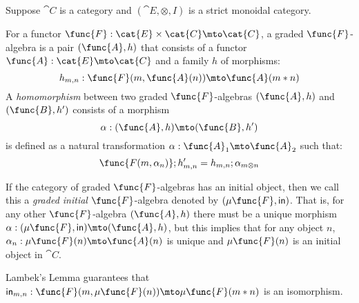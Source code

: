 Suppose $\cat{C}$ is a category and $(\cat{E},\otimes,I)$ is a strict
monoidal category.

\begin{definition}
    For a functor $\func{F} : \cat{E} \times \cat{C} \mto \cat{C}$, a
    graded $\func{F}$-algebra is a pair $(\func{A},h)$ that consists
    of a functor $\func{A} : \cat{E} \mto \cat{C}$ and a family $h$ of
    morphisms:
    \[ 
        h_{m,n} : \func{F}(m,\func{A}(n)) \mto \func{A}(m * n)
    \]
    A \emph{homomorphism} between two graded $\func{F}$-algebras
    $(\func{A},h)$ and $(\func{B},h')$ consists of a morphism
    \[
        \alpha : (\func{A},h) \mto (\func{B},h')
    \]
    is defined as a natural transformation $\alpha : \func{A}_1 \mto
    \func{A}_2$ such that:
    \[
        \func{F(m,\alpha_n)} ; h'_{m,n} = h_{m,n} ; \alpha_{m \otimes n}
    \]
\end{definition}

\begin{definition}
    If the category of graded $\func{F}$-algebras has an initial object, then
    we call this a \emph{graded initial} $\func{F}$-algebra denoted
    by $(\mu\func{F}, \mathsf{in})$.  That is, for any other
    $\func{F}$-algebra $(\func{A},h)$ there must be a unique morphism 
    $\alpha : (\mu\func{F}, \mathsf{in}) \mto (\func{A},h)$, but this
    implies that for any object $n$, $\alpha_n : \mu\func{F}(n) \mto
    \func{A}(n)$ is unique and $\mu\func{F}(n)$ is an initial object
    in $\cat{C}$.
\end{definition}

Lambek's Lemma guarantees that
$\mathsf{in}_{m,n} : \func{F}(m,\mu\func{F}(n)) \mto \mu\func{F}(m *
n)$ is an isomorphism.